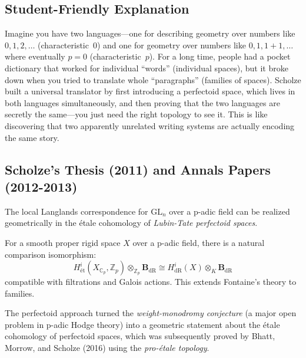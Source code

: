 \subsection{Student-Friendly Explanation}
Imagine you have two languages---one for describing geometry over numbers like $0, 1, 2, \ldots$ (characteristic~$0$) and one for geometry over numbers like $0, 1, 1+1, \ldots$ where eventually $p=0$ (characteristic~$p$). For a long time, people had a pocket dictionary that worked for individual ``words'' (individual spaces), but it broke down when you tried to translate whole ``paragraphs'' (families of spaces). Scholze built a universal translator by first introducing a perfectoid space, which lives in both languages simultaneously, and then proving that the two languages are secretly the same---you just need the right topology to see it. This is like discovering that two apparently unrelated writing systems are actually encoding the same story.

\subsection{Scholze's Thesis (2011) and Annals Papers (2012-2013)}

\begin{theorem}
The local Langlands correspondence for $\text{GL}_n$ over a p-adic field can be realized geometrically in the \'etale cohomology of \emph{Lubin-Tate perfectoid spaces}.
\end{theorem}

\begin{theorem}
For a smooth proper rigid space $X$ over a p-adic field, there is a natural comparison isomorphism:
\[
H^i_{\text{\'et}}(X_{\mathbb{C}_p}, \mathbb{Z}_p) \otimes_{\mathbb{Z}_p} \mathbf{B}_{\text{dR}} \cong H^i_{\text{dR}}(X) \otimes_K \mathbf{B}_{\text{dR}}
\]
compatible with filtrations and Galois actions. This extends Fontaine's theory to families.
\end{theorem}

\begin{highlightbox}
The perfectoid approach turned the \emph{weight-monodromy conjecture} (a major open problem in p-adic Hodge theory) into a geometric statement about the \'etale cohomology of perfectoid spaces, which was subsequently proved by Bhatt, Morrow, and Scholze (2016) using the \emph{pro-\'etale topology}.
\end{highlightbox}

